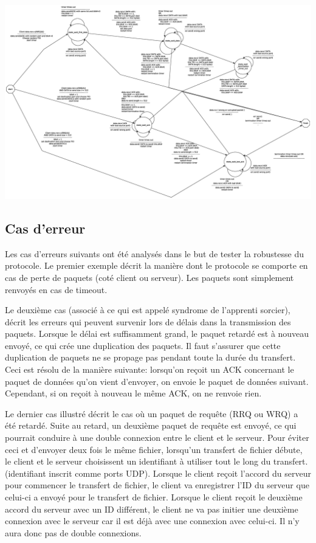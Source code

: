 \documentclass[11pt,a4paper]{article}
\begin{document}
  \begin{center}
	  \includegraphics[width=1\textwidth]{ressources/server_state-machine.eps}
  \end{center}  
  
  \subsection{Cas d'erreur}
  
  \par Les cas d'erreurs suivants ont été analysés dans le but de tester la robustesse du protocole. Le premier exemple décrit la manière dont le protocole se comporte en cas de perte de paquets (coté client ou serveur). Les paquets sont simplement renvoyés en cas de timeout.
  
  \par Le deuxième cas (associé à ce qui est appelé syndrome de l’apprenti sorcier), décrit les erreurs qui peuvent survenir lors de délais dans la transmission des paquets.   Lorsque le délai est suffisamment grand, le paquet retardé est à nouveau envoyé, ce qui crée une duplication des paquets. Il faut s'assurer que cette duplication de paquets ne se propage pas pendant toute la durée du transfert. Ceci est résolu de la manière suivante: lorsqu'on reçoit un ACK concernant le paquet de données qu'on vient d'envoyer, on envoie le paquet de données suivant. Cependant, si on reçoit à nouveau le même ACK, on ne renvoie rien. 
  
  \par Le dernier cas illustré décrit le cas où un paquet de requête (RRQ ou WRQ) a été retardé. Suite au retard, un deuxième paquet de requête est envoyé, ce qui pourrait conduire à une double connexion entre le client et le serveur. Pour éviter ceci et d'envoyer deux fois le même fichier, lorsqu'un transfert de fichier débute, le client et le serveur choisissent un identifiant à utiliser tout le long du transfert. (identifiant inscrit comme ports UDP). Lorsque le client reçoit l'accord du serveur pour commencer le transfert de fichier, le client va enregistrer l'ID du serveur que celui-ci a envoyé pour le transfert de fichier. Lorsque le client reçoit le deuxième accord du serveur avec un ID différent, le client ne va pas initier une deuxième connexion avec le serveur car il est déjà avec une connexion avec celui-ci. Il n'y aura donc pas de double connexions. 
  
\end{document}
